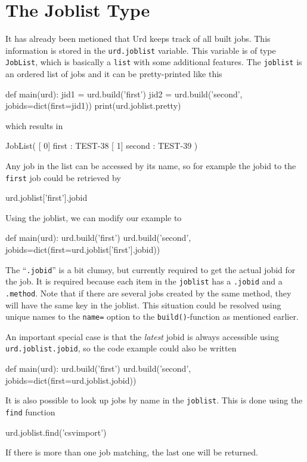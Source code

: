 \section{The Joblist Type}
It has already been metioned that Urd keeps track of all built jobs.
This information is stored in the \texttt{urd.joblist} variable.  This
variable is of type \texttt{JobList}, which is basically
a \texttt{list} with some additional features.  The \texttt{joblist}
is an ordered list of jobs and it can be pretty-printed like this
\begin{python}
def main(urd):
    jid1 = urd.build('first')
    jid2 = urd.build('second', jobids=dict(first=jid1))
    print(urd.joblist.pretty)
\end{python}
which results in
\begin{shell}
JobList(
   [  0]  first : TEST-38
   [  1] second : TEST-39
)
\end{shell}
Any job in the list can be accessed by its name, so for example the
jobid to the \texttt{first} job could be retrieved by
\begin{python}
urd.joblist['first'].jobid
\end{python}
Using the joblist, we can modify our example to
\begin{python}
def main(urd):
    urd.build('first')
    urd.build('second', jobids=dict(first=urd.joblist['first'].jobid))
\end{python}
The ``\texttt{.jobid}'' is a bit clumsy, but currently required to get
the actual jobid for the job.  It is required because each item in
the \texttt{joblist} has a \texttt{.jobid} and a \texttt{.method}.
Note that if there are several jobs created by the same method, they
will have the same key in the joblist.  This situation could be
resolved using unique names to the \texttt{name=} option to
the \texttt{build()}-function as mentioned earlier.

An important special case is that the \textsl{latest} jobid is always
accessible using \texttt{urd.joblist.jobid}, so the code example could
also be written
\begin{python}
def main(urd):
    urd.build('first')
    urd.build('second', jobids=dict(first=urd.joblist.jobid))
\end{python}

It is also possible to look up jobs by name in the \texttt{joblist}.
This is done using the \texttt{find} function
\begin{python}
urd.joblist.find('csvimport')
\end{python}
If there is more than one job matching, the last one will be returned.


